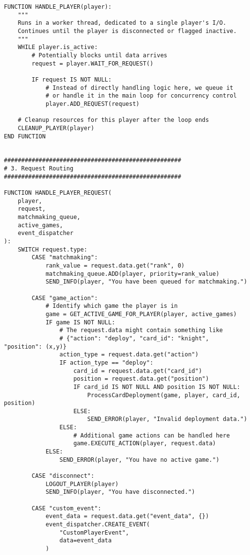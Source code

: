\documentclass{article}
\begin{document}
\begin{lstlisting}[style=pseudo]
FUNCTION HANDLE_PLAYER(player):
    """
    Runs in a worker thread, dedicated to a single player's I/O.
    Continues until the player is disconnected or flagged inactive.
    """
    WHILE player.is_active:
        # Potentially blocks until data arrives
        request = player.WAIT_FOR_REQUEST()
        
        IF request IS NOT NULL:
            # Instead of directly handling logic here, we queue it 
            # or handle it in the main loop for concurrency control
            player.ADD_REQUEST(request)
    
    # Cleanup resources for this player after the loop ends
    CLEANUP_PLAYER(player)
END FUNCTION


###################################################
# 3. Request Routing
###################################################

FUNCTION HANDLE_PLAYER_REQUEST(
    player, 
    request, 
    matchmaking_queue, 
    active_games, 
    event_dispatcher
):
    SWITCH request.type:
        CASE "matchmaking":
            rank_value = request.data.get("rank", 0)
            matchmaking_queue.ADD(player, priority=rank_value)
            SEND_INFO(player, "You have been queued for matchmaking.")

        CASE "game_action":
            # Identify which game the player is in
            game = GET_ACTIVE_GAME_FOR_PLAYER(player, active_games)
            IF game IS NOT NULL:
                # The request.data might contain something like 
                # {"action": "deploy", "card_id": "knight", "position": (x,y)}
                action_type = request.data.get("action")
                IF action_type == "deploy":
                    card_id = request.data.get("card_id")
                    position = request.data.get("position")
                    IF card_id IS NOT NULL AND position IS NOT NULL:
                        ProcessCardDeployment(game, player, card_id, position)
                    ELSE:
                        SEND_ERROR(player, "Invalid deployment data.")
                ELSE:
                    # Additional game actions can be handled here
                    game.EXECUTE_ACTION(player, request.data)
            ELSE:
                SEND_ERROR(player, "You have no active game.")

        CASE "disconnect":
            LOGOUT_PLAYER(player)
            SEND_INFO(player, "You have disconnected.")

        CASE "custom_event":
            event_data = request.data.get("event_data", {})
            event_dispatcher.CREATE_EVENT(
                "CustomPlayerEvent", 
                data=event_data
            )


\end{lstlisting}
\end{document}
